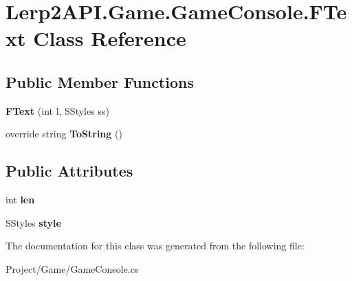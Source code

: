\hypertarget{class_lerp2_a_p_i_1_1_game_1_1_game_console_1_1_f_text}{}\section{Lerp2\+A\+P\+I.\+Game.\+Game\+Console.\+F\+Text Class Reference}
\label{class_lerp2_a_p_i_1_1_game_1_1_game_console_1_1_f_text}
\subsection*{Public Member Functions}
\begin{DoxyCompactItemize}
\item 
\mbox{\label{class_lerp2_a_p_i_1_1_game_1_1_game_console_1_1_f_text_a38bb38a017db450615bc85934144549f}} 
{\bfseries F\+Text} (int l, S\+Styles ss)
\item 
\mbox{\label{class_lerp2_a_p_i_1_1_game_1_1_game_console_1_1_f_text_af20627132482eb8907b169f3ae96e522}} 
override string {\bfseries To\+String} ()
\end{DoxyCompactItemize}
\subsection*{Public Attributes}
\begin{DoxyCompactItemize}
\item 
\mbox{\label{class_lerp2_a_p_i_1_1_game_1_1_game_console_1_1_f_text_ad79114144c9e6d45d1bd41f20b3c25b9}} 
int {\bfseries len}
\item 
\mbox{\label{class_lerp2_a_p_i_1_1_game_1_1_game_console_1_1_f_text_a3e1ec23d73b4cae7b21608d3175da2b6}} 
S\+Styles {\bfseries style}
\end{DoxyCompactItemize}


The documentation for this class was generated from the following file\+:\begin{DoxyCompactItemize}
\item 
Project/\+Game/Game\+Console.\+cs\end{DoxyCompactItemize}
